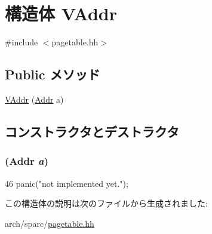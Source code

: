 \hypertarget{structSparcISA_1_1VAddr}{
\section{構造体 VAddr}
\label{structSparcISA_1_1VAddr}
}


{\ttfamily \#include $<$pagetable.hh$>$}\subsection*{Public メソッド}
\begin{DoxyCompactItemize}
\item 
\hyperlink{structSparcISA_1_1VAddr_aea4be566b2249d0b69dcee270c8b461d}{VAddr} (\hyperlink{base_2types_8hh_af1bb03d6a4ee096394a6749f0a169232}{Addr} a)
\end{DoxyCompactItemize}


\subsection{コンストラクタとデストラクタ}
\hypertarget{structSparcISA_1_1VAddr_aea4be566b2249d0b69dcee270c8b461d}{
\subsubsection[{VAddr}]{ ({\bf Addr} {\em a})}}
\label{structSparcISA_1_1VAddr_aea4be566b2249d0b69dcee270c8b461d}



\begin{DoxyCode}
46 { panic("not implemented yet."); }
\end{DoxyCode}


この構造体の説明は次のファイルから生成されました:\begin{DoxyCompactItemize}
\item 
arch/sparc/\hyperlink{sparc_2pagetable_8hh}{pagetable.hh}\end{DoxyCompactItemize}
